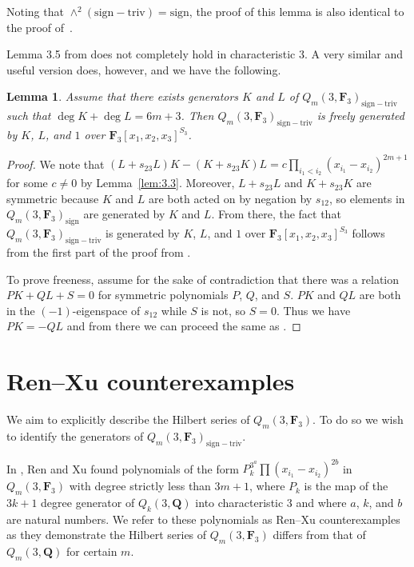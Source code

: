 \documentclass[pdftex]{sigma}
\newtheorem{Lemma}[Theorem]{Lemma}
\theoremstyle{definition}
\numberwithin{equation}{section}
\newcommand{\sign}{\mathrm{sign}}
\newcommand{\siv}{\mathrm{sign-triv}}
\begin{document}
Noting that $\wedge^2(\siv) = \sign$, the proof of this lemma is also identical to the proof of~\mbox{\cite[Lemma 3.4]{wang2022explicit}}.

Lemma 3.5 from \cite{wang2022explicit} does not completely hold in characteristic $3$. A very similar and useful version does, however, and we have the following.

\begin{Lemma}\label{lem:3.4}
 Assume that there exists generators $K$ and $L$ of $Q_m(3,\mathbf{F}_3)_\siv$ such that $\deg K+\deg L=6m+3$. Then $Q_m(3,\mathbf{F}_3)_\siv$ is freely generated by $K$, $L$, and $1$ over $\mathbf{F}_3[x_1,x_2,x_3]^{S_3}$.
\end{Lemma}
\begin{proof}
 We note that $(L+s_{23}L)K-(K+s_{23}K)L=c\prod_{i_1<i_2}(x_{i_1}-x_{i_2})^{2m+1}$ for some $c\neq 0$ by Lemma~\ref{lem:3.3}. Moreover, $L+s_{23}L$ and $K+s_{23}K$ are symmetric because $K$ and $L$ are both acted on by negation by $s_{12}$, so elements in $Q_m(3,\mathbf{F}_3)_{\sign}$ are generated by $K$ and $L$. From there, the fact that $Q_m(3,\mathbf{F}_3)_\siv$ is generated by $K$, $L$, and $1$ over $\mathbf{F}_3[x_1,x_2,x_3]^{S_3}$ follows from the first part of the proof from \cite{wang2022explicit}.

 To prove freeness, assume for the sake of contradiction that there was a relation $PK+QL+S=0$ for symmetric polynomials $P$, $Q$, and $S$. $PK$ and $QL$ are both in the $(-1)$-eigenspace of $s_{12}$ while $S$ is not, so $S=0$. Thus we have $PK=-QL$ and from there we can proceed the same as \cite{wang2022explicit}.

\end{proof}

\section{Ren--Xu counterexamples}\label{sec:renxu}

We aim to explicitly describe the Hilbert series of $Q_m(3,\mathbf{F}_3)$. To do so we wish to identify the generators of $Q_m(3,\mathbf{F}_3)_{\siv}$.

In \cite{Ren_2020}, Ren and Xu found polynomials of the form $P_k^{3^a}\prod (x_{i_1}-x_{i_2})^{2b}$ in $Q_m(3,\mathbf{F}_3)$ with degree strictly less than $3m+1$, where $P_k$ is the map of the $3k+1$ degree generator of $Q_k(3,\mathbf{Q})$ into characteristic $3$ and where $a$, $k$, and $b$ are natural numbers. We refer to these polynomials as Ren--Xu counterexamples as they demonstrate the Hilbert series of $Q_m(3,\mathbf{F}_3)$ differs from that of $Q_m(3,\mathbf{Q})$ for certain $m$.
\end{document}
